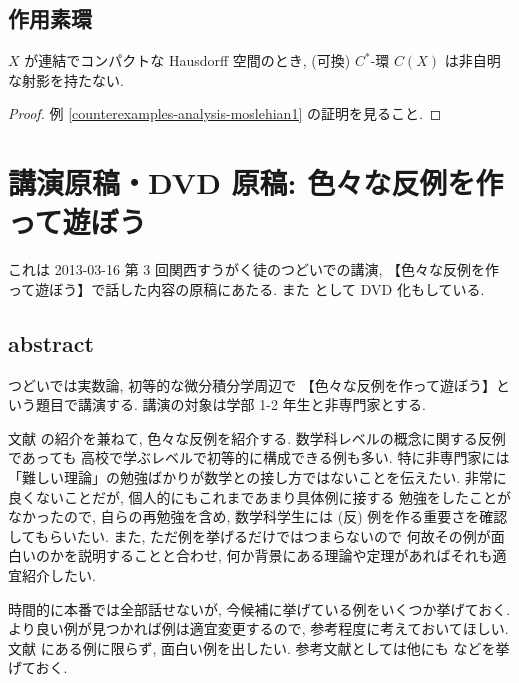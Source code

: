 \documentclass[openany, a4paper, oneside]{jsbook}
\begin{document}
\section{作用素環}

\begin{ex}
$X$ が連結でコンパクトな Hausdorff 空間のとき,
(可換) $C^*$-環 $C(X)$ は非自明な射影を持たない.
\end{ex}
\begin{proof}
例 \ref{counterexamples-analysis-moslehian1} の証明を見ること.
\end{proof}
\chapter{講演原稿・DVD 原稿:  色々な反例を作って遊ぼう}

これは 2013-03-16 第 3 回関西すうがく徒のつどいでの講演,
【色々な反例を作って遊ぼう】で話した内容の原稿にあたる.
また \cite{phasetr1} として DVD 化もしている.
\section{abstract}

つどいでは実数論, 初等的な微分積分学周辺で
【色々な反例を作って遊ぼう】という題目で講演する.
講演の対象は学部 1-2 年生と非専門家とする.

文献 \cite{GelbaumOlmsted1} の紹介を兼ねて, 色々な反例を紹介する.
数学科レベルの概念に関する反例であっても
高校で学ぶレベルで初等的に構成できる例も多い.
特に非専門家には「難しい理論」の勉強ばかりが数学との接し方ではないことを伝えたい.
非常に良くないことだが, 個人的にもこれまであまり具体例に接する
勉強をしたことがなかったので, 自らの再勉強を含め,
数学科学生には (反) 例を作る重要さを確認してもらいたい.
また, ただ例を挙げるだけではつまらないので
何故その例が面白いのかを説明することと合わせ,
何か背景にある理論や定理があればそれも適宜紹介したい.

時間的に本番では全部話せないが, 今候補に挙げている例をいくつか挙げておく.
より良い例が見つかれば例は適宜変更するので, 参考程度に考えておいてほしい.
文献 \cite{GelbaumOlmsted1} にある例に限らず, 面白い例を出したい.
参考文献としては他にも \cite{HikosaburoKomatsu1, DavidWilliams1, WilliamDumham1} などを挙げておく.
\end{document}
